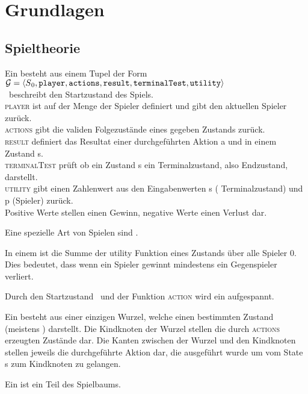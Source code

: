 \chapter{Grundlagen}
\section{Spieltheorie}
\begin{Definition}
Ein  besteht aus einem Tupel der Form \\[0.2cm]
  \hspace*{1.3cm}
  $\mathcal{G} = \langle S\textsubscript{0},\mathtt{player}, \mathtt{actions}, \mathtt{result}, \mathtt{terminalTest}, \mathtt{utility} \rangle$
\\\so\ beschreibt den Startzustand des Spiels.
\\\textsc{player} ist auf der Menge der Spieler definiert und gibt den aktuellen Spieler zurück.
\\\textsc{actions} gibt die validen Folgezustände eines gegeben Zustands zurück.
\\\textsc{result} definiert das Resultat einer durchgeführten Aktion a und in einem Zustand s.
\\\textsc{terminalTest} prüft ob ein Zustand s ein Terminalzustand, also Endzustand, darstellt.
\\\textsc{utility} gibt einen Zahlenwert aus den Eingabenwerten s ( Terminalzustand) und p (Spieler) zurück. \\Positive Werte stellen einen Gewinn, negative Werte einen Verlust dar.
\end{Definition}
Eine spezielle Art von Spielen sind .
\begin{Definition}[Nullsummenspiele]
In einem  ist die Summe der utility Funktion eines Zustands über alle Spieler 0. Dies bedeutet, dass wenn ein Spieler gewinnt mindestens ein Gegenspieler verliert.
\end{Definition}
Durch den Startzustand \so\ und der Funktion \textsc{action} wird ein  aufgespannt.
\begin{Definition}
Ein  besteht aus einer einzigen Wurzel, welche einen bestimmten Zustand (meistens \so) darstellt. Die Kindknoten der Wurzel stellen die durch \textsc{actions} erzeugten Zustände dar. Die Kanten zwischen der Wurzel und den Kindknoten stellen jeweils die durchgeführte Aktion dar, die ausgeführt wurde um vom State s zum Kindknoten zu gelangen.
\end{Definition}
\begin{Definition}
Ein  ist ein Teil des Spielbaums.
\end{Definition}
\cite{Russell.2016}

